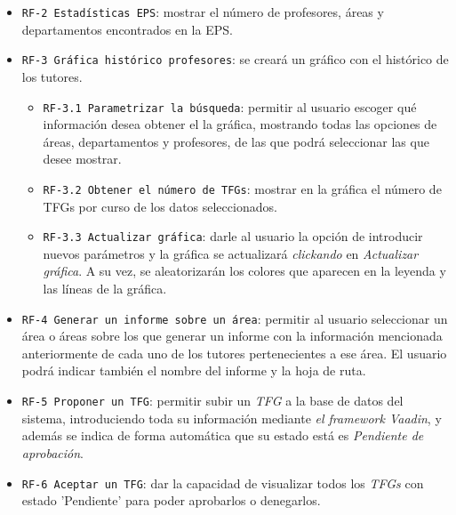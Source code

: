 \begin{itemize}
\begin{itemize}
		\end{itemize}
		\item \texttt{RF-2  Estadísticas EPS}: mostrar el número de profesores, áreas y departamentos encontrados en la EPS.
		\item \texttt{RF-3 Gráfica histórico profesores}: se creará un gráfico con el histórico de los tutores.
		\begin{itemize}
			\item \texttt{RF-3.1 Parametrizar la búsqueda}: permitir al usuario escoger qué información desea obtener el la gráfica, mostrando todas las opciones de áreas, departamentos y profesores, de las que podrá seleccionar las que desee mostrar.
			\item \texttt{RF-3.2 Obtener el número de TFGs}: mostrar en la gráfica el número de TFGs por curso de los datos seleccionados.
			\item \texttt{RF-3.3 Actualizar gráfica}: darle al usuario la opción de introducir nuevos parámetros y la gráfica se actualizará \emph{clickando} en \emph{Actualizar gráfica}. A su vez, se aleatorizarán los colores que aparecen en la leyenda y las líneas de la gráfica.
		\end{itemize}
		\item \texttt{RF-4 Generar un informe sobre un área}: permitir al usuario seleccionar un área o áreas sobre los que generar un informe con la información  mencionada anteriormente de cada uno de los tutores pertenecientes a ese área. El usuario podrá indicar también el nombre del informe y la hoja de ruta.
		\item \texttt{RF-5 Proponer un TFG}: permitir subir un \emph{TFG} a la base de datos del sistema, introduciendo toda su información mediante \emph{el framework Vaadin}, y además se indica de forma automática que su estado está es \emph{Pendiente de aprobación}.
		\item \texttt{RF-6 Aceptar un TFG}: dar la capacidad de visualizar todos los \emph{TFGs} con estado 'Pendiente' para poder aprobarlos o denegarlos.
		
\end{itemize}

